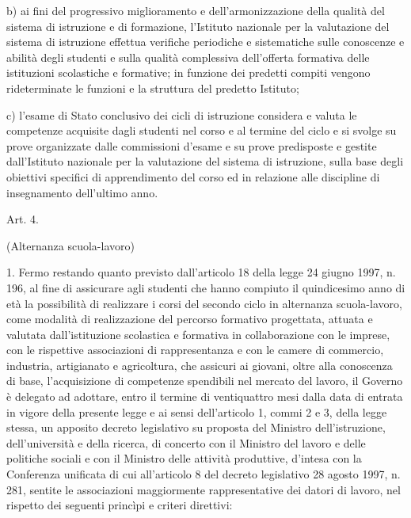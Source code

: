 b) ai fini del progressivo miglioramento e dell'armonizzazione della qualità del sistema di istruzione e di formazione, l'Istituto nazionale per la valutazione del sistema di istruzione effettua verifiche periodiche e sistematiche sulle conoscenze e abilità degli studenti e sulla qualità complessiva dell'offerta formativa delle istituzioni scolastiche e formative; in funzione dei predetti compiti vengono rideterminate le funzioni e la struttura del predetto Istituto;

c) l'esame di Stato conclusivo dei cicli di istruzione considera e valuta le competenze acquisite dagli studenti nel corso e al termine del ciclo e si svolge su prove organizzate dalle commissioni d'esame e su prove predisposte e gestite dall'Istituto nazionale per la valutazione del sistema di istruzione, sulla base degli obiettivi specifici di apprendimento del corso ed in relazione alle discipline di insegnamento dell'ultimo anno.

Art. 4.

(Alternanza scuola-lavoro)

1. Fermo restando quanto previsto dall'articolo 18 della legge 24 giugno 1997, n. 196, al fine di assicurare agli studenti che hanno compiuto il quindicesimo anno di età la possibilità di realizzare i corsi del secondo ciclo in alternanza scuola-lavoro, come modalità di realizzazione del percorso formativo progettata, attuata e valutata dall'istituzione scolastica e formativa in collaborazione con le imprese, con le rispettive associazioni di rappresentanza e con le camere di commercio, industria, artigianato e agricoltura, che assicuri ai giovani, oltre alla conoscenza di base, l'acquisizione di competenze spendibili nel mercato del lavoro, il Governo è delegato ad adottare, entro il termine di ventiquattro mesi dalla data di entrata in vigore della presente legge e ai sensi dell'articolo 1, commi 2 e 3, della legge stessa, un apposito decreto legislativo su proposta del Ministro dell'istruzione, dell'università e della ricerca, di concerto con il Ministro del lavoro e delle politiche sociali e con il Ministro delle attività produttive, d'intesa con la Conferenza unificata di cui all'articolo 8 del decreto legislativo 28 agosto 1997, n. 281, sentite le associazioni maggiormente rappresentative dei datori di lavoro, nel rispetto dei seguenti princìpi e criteri direttivi:

